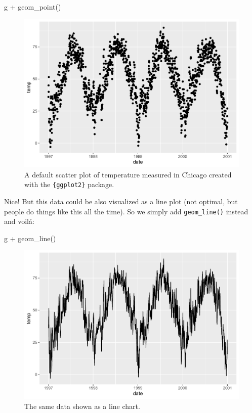 \documentclass[
]{krantz}
\makeatletter
\newenvironment{Shaded}{\begin{snugshade}}{\end{snugshade}}
\newcommand{\FunctionTok}[1]{\textcolor[rgb]{0,0,0}{#1}}
\newcommand{\NormalTok}[1]{#1}
\newcommand{\SpecialCharTok}[1]{\textcolor[rgb]{0,0,0}{#1}}
\newenvironment{kframe}{%
\medskip{}
\setlength{\fboxsep}{.8em}
 \def\at@end@of@kframe{}%
 \ifinner\ifhmode%
  \def\at@end@of@kframe{\end{minipage}}%
  \begin{minipage}{\columnwidth}%
 \fi\fi%
 \def\FrameCommand##1{\hskip\@totalleftmargin \hskip-\fboxsep
 \colorbox{shadecolor}{##1}\hskip-\fboxsep
     \hskip-\linewidth \hskip-\@totalleftmargin \hskip\columnwidth}%
 \MakeFramed {\advance\hsize-\width
   \@totalleftmargin\z@ \linewidth\hsize
   \@setminipage}}%
 {\par\unskip\endMakeFramed%
 \at@end@of@kframe}
\renewenvironment{Shaded}{\begin{kframe}}{\end{kframe}}
\makeatother
\begin{document}
\begin{Shaded}
\begin{Highlighting}[]
\NormalTok{g }\SpecialCharTok{+} \FunctionTok{geom\_point}\NormalTok{()}
\end{Highlighting}
\end{Shaded}

\begin{figure}
\centering
\includegraphics{bookdown_files/figure-latex/ggplot-default-1.pdf}
\caption{\label{fig:ggplot-default}A default scatter plot of temperature measured in Chicago created with the \texttt{\{ggplot2\}} package.}
\end{figure}

Nice! But this data could be also visualized as a line plot (not optimal, but people do things like this all the time). So we simply add \texttt{geom\_line()} instead and voilá:

\begin{Shaded}
\begin{Highlighting}[]
\NormalTok{g }\SpecialCharTok{+} \FunctionTok{geom\_line}\NormalTok{()}
\end{Highlighting}
\end{Shaded}

\begin{figure}
\centering
\includegraphics{bookdown_files/figure-latex/ggplot-default-line-1.pdf}
\caption{\label{fig:ggplot-default-line}The same data shown as a line chart.}
\end{figure}
\end{document}
